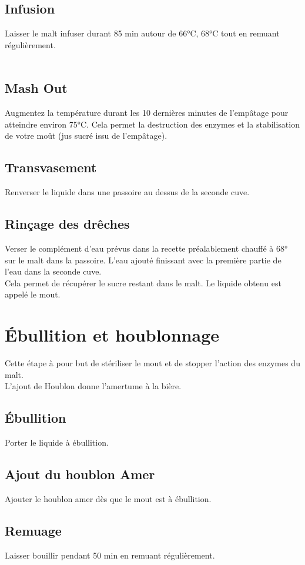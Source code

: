 \documentclass[twoside,twocolumn]{report}
\begin{document}
		\subsection{Infusion}
		Laisser le malt infuser durant 85 min autour de 66°C, 68°C tout en remuant régulièrement.\\ \\
		\subsection{ Mash Out}
		Augmentez la température durant les 10 dernières minutes de l’empâtage pour atteindre environ 75°C. Cela  permet la destruction des
		enzymes et la stabilisation de votre moût  (jus  sucré issu  de l’empâtage).
		\subsection{Transvasement }
		Renverser le liquide dans une passoire au dessus de la seconde cuve.\\
		\subsection{Rinçage des drêches}
		Verser le complément d'eau prévus dans la recette préalablement chauffé à 68° sur le malt dans la passoire. L'eau ajouté finissant avec la première partie de l'eau dans la seconde cuve.\\
		Cela permet de récupérer le sucre restant dans le malt. Le liquide obtenu est appelé le mout.
		
		\section{Ébullition et houblonnage}
		Cette étape à pour but de stériliser le mout et de stopper l'action des enzymes du malt.\\ L'ajout de Houblon donne l'amertume à la bière.
		\subsection{Ébullition}
		Porter le liquide à ébullition.
		\subsection{Ajout du houblon Amer }
		Ajouter le houblon amer dès que le mout est à ébullition.
		\subsection{Remuage}
		Laisser bouillir pendant 50 min en  remuant régulièrement.\\ \\
		
\end{document}
